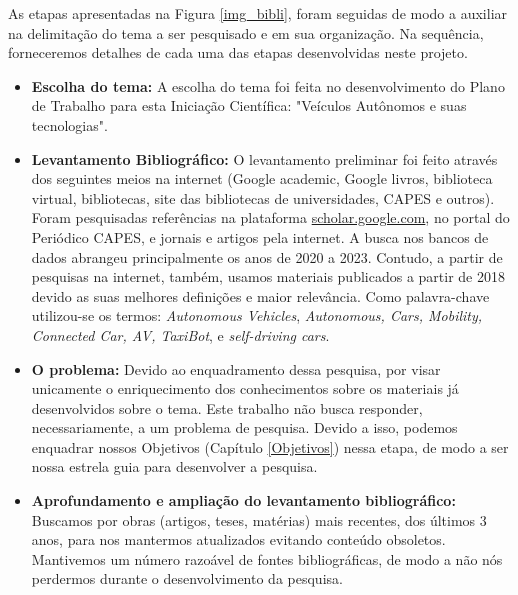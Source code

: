 As etapas apresentadas na Figura \ref{img_bibli}, foram seguidas de modo a auxiliar na
delimitação do tema a ser pesquisado e em sua organização. Na sequência, forneceremos detalhes de cada uma das etapas desenvolvidas neste projeto.
\begin{itemize}\label{details}

\item \textbf{Escolha do tema:} A escolha do tema foi feita no desenvolvimento do Plano de Trabalho para esta Iniciação Científica: "Veículos Autônomos e suas tecnologias". 

\item \textbf{Levantamento Bibliográfico:} O levantamento preliminar foi feito através dos seguintes meios na internet (Google academic, Google livros, biblioteca virtual, bibliotecas, site das bibliotecas de universidades, CAPES e outros). Foram pesquisadas referências na plataforma \url{scholar.google.com}, no portal do Periódico CAPES, e jornais e artigos pela internet. A busca nos bancos de dados abrangeu principalmente os anos de 2020 a 2023. Contudo, a partir de pesquisas na internet, também, usamos materiais publicados a partir de 2018 devido as suas melhores definições e maior relevância. Como palavra-chave utilizou-se os termos: \textit{Autonomous Vehicles}, \textit{Autonomous, Cars, Mobility, Connected Car, AV, TaxiBot}, e \textit{self-driving cars}.  %

\item \textbf{O problema:} Devido ao enquadramento dessa pesquisa, por visar unicamente o enriquecimento dos conhecimentos sobre os materiais já desenvolvidos sobre o tema. Este trabalho não busca responder, necessariamente, a um problema de pesquisa. Devido a isso, podemos enquadrar nossos Objetivos (Capítulo \ref{Objetivos}) nessa etapa, de modo a ser nossa estrela guia para desenvolver a pesquisa.

\item \textbf{Aprofundamento e ampliação do levantamento bibliográfico:} Buscamos por obras (artigos, teses, matérias) mais recentes, dos últimos 3 anos, para nos mantermos atualizados evitando conteúdo obsoletos. Mantivemos um número razoável de fontes bibliográficas, de modo a não nós perdermos durante o desenvolvimento da pesquisa. 


\end{itemize}
